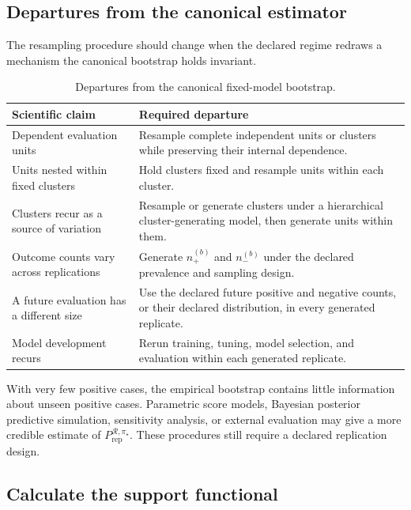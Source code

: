 \documentclass[11pt]{article}
\newcommand{\Regime}{\mathcal{R}}
\newcommand{\PRep}{P_{\mathrm{rep}}^{\Regime,\pi_\star}}
\theoremstyle{remark}
\begin{document}
\subsection{Departures from the canonical estimator}

The resampling procedure should change when the declared regime redraws a mechanism the canonical bootstrap holds invariant.

\begin{table}[ht]
\centering
\caption{Departures from the canonical fixed-model bootstrap.}
\label{tab:replication}
\begin{tabularx}{\textwidth}{@{}>{\raggedright\arraybackslash}p{}>{\raggedright\arraybackslash}X@{}}
\toprule
Scientific claim & Required departure \\
\midrule
Dependent evaluation units & Resample complete independent units or clusters while preserving their internal dependence. \\
Units nested within fixed clusters & Hold clusters fixed and resample units within each cluster. \\
Clusters recur as a source of variation & Resample or generate clusters under a hierarchical cluster-generating model, then generate units within them. \\
Outcome counts vary across replications & Generate $n_+^{(b)}$ and $n_-^{(b)}$ under the declared prevalence and sampling design. \\
A future evaluation has a different size & Use the declared future positive and negative counts, or their declared distribution, in every generated replicate. \\
Model development recurs & Rerun training, tuning, model selection, and evaluation within each generated replicate. \\
\bottomrule
\end{tabularx}
\end{table}

With very few positive cases, the empirical bootstrap contains little information about unseen positive cases. Parametric score models, Bayesian posterior predictive simulation, sensitivity analysis, or external evaluation may give a more credible estimate of $\PRep$. These procedures still require a declared replication design.

\subsection{Calculate the support functional}
\end{document}
